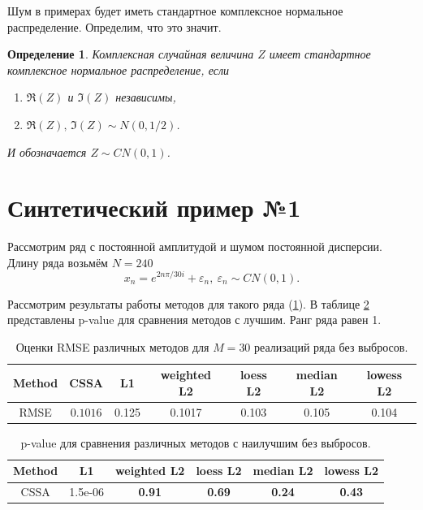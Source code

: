 \documentclass[specialist,
               substylefile = spbu.rtx,
               subf,href,colorlinks=true, 12pt]{disser}
\newtheorem*{def*}{Определение}
\begin{document}
Шум в примерах будет иметь стандартное комплексное нормальное распределение. Определим, что это значит.
\begin{def*}
	Комплексная случайная величина $Z$ имеет стандартное комплексное нормальное распределение, если
	\begin{enumerate}
		\item $\Re(Z)$ и $\Im(Z)$ независимы,
		\item $\Re(Z), \, \Im(Z) \sim N(0, 1/2)$.
	\end{enumerate}
	И обозначается $Z \sim CN(0, 1)$. 
\end{def*}


\section{Синтетический пример №1}

Рассмотрим ряд с постоянной амплитудой и шумом постоянной дисперсии.
Длину ряда возьмём $N = 240$
$$x_n = e^{2n\pi/30i} + \varepsilon_n, ~ \varepsilon_n \sim CN(0,1).$$
 
Рассмотрим результаты работы методов для такого ряда (\ref{tab1}). В таблице \ref{tab: pval1} представлены p-value для сравнения методов с лучшим. Ранг ряда равен 1.

\begin{table}[H]
	\begin{center}
		\caption{Оценки RMSE различных методов для $M = 30$ реализаций ряда без выбросов.}
		\label{tab1}
		\begin{tabular}{|c|c|c|c|c|c|c|}
			\hline
			Method 	& CSSA & L1 & weighted L2 & loess L2 & median L2 & lowess L2 \\ 
			\hline
			RMSE & $\mathbf{0.1016}$  & 0.125  & 0.1017 & 0.103 & 0.105 & 0.104\\
			\hline
		\end{tabular}
	\end{center}
\end{table}

\begin{table}[H]
	\caption{p-value для сравнения различных методов с наилучшим без выбросов.}
	\label{tab: pval1}
	\begin{center}
		\begin{tabular}{|c|c|c|c|c|c|}
			\hline
			Method & L1 & weighted L2 & loess L2 & median L2 & lowess L2  \\ 
			\hline
			CSSA & 1.5e-06   & \textbf{0.91} & \textbf{0.69}  & \textbf{0.24} & \textbf{0.43}  \\
			\hline
		\end{tabular} \\
	\end{center}
\end{table}
\end{document}
